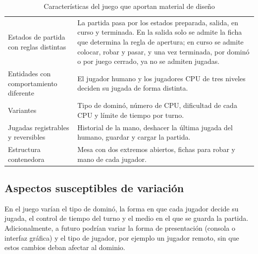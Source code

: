 \begin{table}[H]
\caption{Características del juego que aportan material de diseño}\label{tab:criterios}
\tablacompacta
\begin{tabularx}{\textwidth}{@{}L{4.4cm}Y@{}}
  \toprule
   &  \\ \midrule
  Estados de partida con reglas distintas & La partida pasa por los estados preparada, salida, en curso y terminada. En la salida solo se admite la ficha que determina la regla de apertura; en curso se admite colocar, robar y pasar, y una vez terminada, por dominó o por juego cerrado, ya no se admiten jugadas. \\ \filasep
  Entidades con comportamiento diferente & El jugador humano y los jugadores CPU de tres niveles deciden su jugada de forma distinta. \\ \filasep
  Variantes & Tipo de dominó, número de CPU, dificultad de cada CPU y límite de tiempo por turno. \\ \filasep
  Jugadas registrables y reversibles & Historial de la mano, deshacer la última jugada del humano, guardar y cargar la partida. \\ \filasep
  Estructura contenedora & Mesa con dos extremos abiertos, fichas para robar y mano de cada jugador. \\
  \bottomrule
\end{tabularx}
\end{table}

\subsection{Aspectos susceptibles de variación}

En el juego varían el tipo de dominó, la forma en que cada jugador decide su jugada, el control de tiempo del turno y el medio en el que se guarda la partida. Adicionalmente, a futuro podrían variar la forma de presentación (consola o interfaz gráfica) y el tipo de jugador, por ejemplo un jugador remoto, sin que estos cambios deban afectar al dominio.

